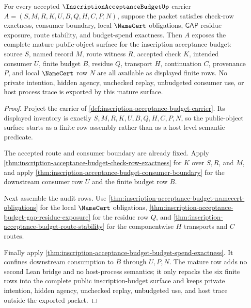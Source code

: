 \begin{theorem}
\label{thm:inscription-acceptance-budget-mature-consumer-completeness}
For every accepted $\InscriptionAcceptanceBudgetUp$ carrier $A=(S,M,R,K,U,B,Q,H,C,P,N)$, suppose the packet satisfies check-row exactness, consumer boundary, local $\NameCert$ obligations, $\mathsf{GAP}$ residue exposure, route stability, and budget-spend exactness. Then $A$ exposes the complete mature public-object surface for the inscription acceptance budget: source $S$, named record $M$, route witness $R$, accepted check $K$, intended consumer $U$, finite budget $B$, residue $Q$, transport $H$, continuation $C$, provenance $P$, and local $\NameCert$ row $N$ are all available as displayed finite rows. No private intention, hidden agency, unchecked replay, unbudgeted consumer use, or host process trace is exported by this mature surface.
\end{theorem}
\begin{proof}
Project the carrier of \autoref{def:inscription-acceptance-budget-carrier}. Its displayed inventory is exactly $S,M,R,K,U,B,Q,H,C,P,N$, so the public-object surface starts as a finite row assembly rather than as a host-level semantic predicate.

The accepted route and consumer boundary are already fixed. Apply \autoref{thm:inscription-acceptance-budget-check-row-exactness} for $K$ over $S,R$, and $M$, and apply \autoref{thm:inscription-acceptance-budget-consumer-boundary} for the downstream consumer row $U$ and the finite budget row $B$.

Next assemble the audit rows. Use \autoref{thm:inscription-acceptance-budget-namecert-obligations} for the local $\NameCert$ obligations, \autoref{thm:inscription-acceptance-budget-gap-residue-exposure} for the residue row $Q$, and \autoref{thm:inscription-acceptance-budget-route-stability} for the componentwise $H$ transports and $C$ routes.

Finally apply \autoref{thm:inscription-acceptance-budget-budget-spend-exactness}. It confines downstream consumption to $B$ through $U,P,N$. The mature row adds no second Lean bridge and no host-process semantics; it only repacks the six finite rows into the complete public inscription-budget surface and keeps private intention, hidden agency, unchecked replay, unbudgeted use, and host trace outside the exported packet.
\end{proof}

